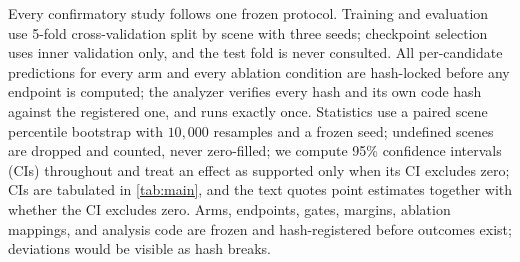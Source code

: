 Every confirmatory study follows one frozen protocol.
Training and evaluation use 5-fold cross-validation split by scene with three seeds; checkpoint selection uses inner validation only, and the test fold is never consulted.
All per-candidate predictions for every arm and every ablation condition are hash-locked before any endpoint is computed; the analyzer verifies every hash and its own code hash against the registered one, and runs exactly once.
Statistics use a paired scene percentile bootstrap with $10{,}000$ resamples and a frozen seed; undefined scenes are dropped and counted, never zero-filled; we compute 95\% confidence intervals (CIs) throughout and treat an effect as supported only when its CI excludes zero; CIs are tabulated in \cref{tab:main}, and the text quotes point estimates together with whether the CI excludes zero.
Arms, endpoints, gates, margins, ablation mappings, and analysis code are frozen and hash-registered before outcomes exist; deviations would be visible as hash breaks.
